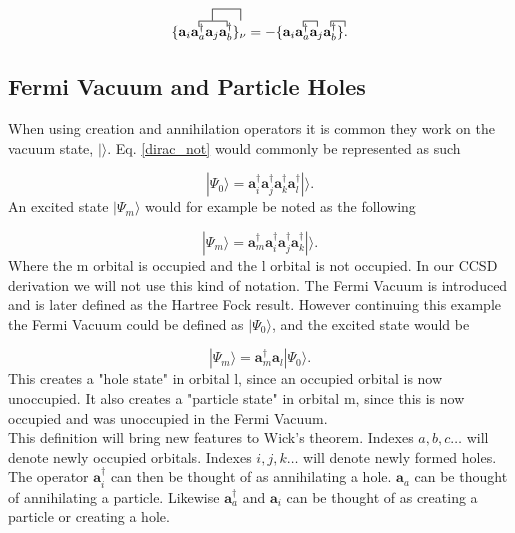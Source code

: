 \documentclass[a4paper,norsk,11pt,twoside]{report}
\begin{document}
\begin{equation}
\{
\contraction{}{\textbf{a}_i}{\textbf{a}^{\dag}_a}{\textbf{a}_j}
\contraction[2ex]{\textbf{a}_i}{\textbf{a}^{\dag}_a}{\textbf{a}_j}{\textbf{a}^{\dag}_b}
\textbf{a}_i \textbf{a}^{\dag}_a \textbf{a}_j \textbf{a}^{\dag}_b
\}_{\nu}
= - \{
\contraction{}{\textbf{a}_i}{}{\textbf{a}^{\dag}_a}
\contraction{\textbf{a}_i \textbf{a}^{\dag}_a}{\textbf{a}_j}{}{\textbf{a}^{\dag}_b}
\textbf{a}_i \textbf{a}^{\dag}_a \textbf{a}_j \textbf{a}^{\dag}_b
\} . \label{examplebullshit}
\end{equation}

\subsection{Fermi Vacuum and Particle Holes}

When using creation and annihilation operators it is common they work on the vacuum state, $| \rangle$. Eq. \eqref{dirac_not} would commonly be represented as such

\begin{equation}
|\Psi_0 \rangle = \textbf{a}^{\dag}_i
\textbf{a}^{\dag}_j
\textbf{a}^{\dag}_k
\textbf{a}^{\dag}_l |\rangle .
\end{equation}
An excited state $|\Psi_m\rangle$ would for example be noted as the following

\begin{equation}
|\Psi_m \rangle = \textbf{a}^{\dag}_m
\textbf{a}^{\dag}_i
\textbf{a}^{\dag}_j
\textbf{a}^{\dag}_k |\rangle .
\end{equation}
Where the m orbital is occupied and the l orbital is not occupied. In our CCSD derivation we will not use this kind of notation. The Fermi Vacuum is introduced and is later defined as the Hartree Fock result. However continuing this example the Fermi Vacuum could be defined as $|\Psi_0\rangle$, and the excited state would be

\begin{equation}
|\Psi_m\rangle = \textbf{a}^{\dag}_m \textbf{a}_l |\Psi_0\rangle .
\end{equation}
This creates a "hole state" in orbital l, since an occupied orbital is now unoccupied. It also creates a "particle state" in orbital m, since this is now occupied and was unoccupied in the Fermi Vacuum. \\

This definition will bring new features to Wick's theorem. Indexes $a, b, c \dots$ will denote newly occupied orbitals. Indexes $i, j, k \dots$ will denote newly formed holes. The operator $\textbf{a}^{\dag}_i$ can then be thought of as annihilating a hole. $\textbf{a}_a$ can be thought of annihilating a particle. Likewise $\textbf{a}^{\dag}_a$ and $\textbf{a}_i$ can be thought of as creating a particle or creating a hole. \\
\end{document}
